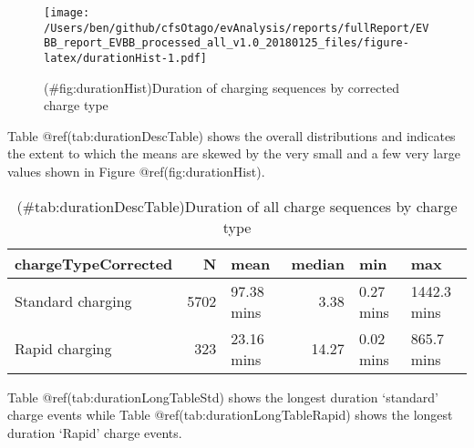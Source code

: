 \documentclass[]{article}
\begin{document}
\begin{figure}
\centering
\texttt{[image: /Users/ben/github/cfsOtago/evAnalysis/reports/fullReport/EVBB\_report\_EVBB\_processed\_all\_v1.0\_20180125\_files/figure-latex/durationHist-1.pdf]}
\caption{(\#fig:durationHist)Duration of charging sequences by corrected charge type}
\end{figure}

Table @ref(tab:durationDescTable) shows the overall distributions and indicates the extent to which the means are skewed by the very small and a few very large values shown in Figure @ref(fig:durationHist).

\begin{table}[t]

\caption{(\#tab:durationDescTable)Duration of all charge sequences by charge type}
\centering
\begin{tabular}{l|r|l|r|l|l}
\hline
chargeTypeCorrected & N & mean & median & min & max\\
\hline
Standard charging & 5702 & 97.38 mins & 3.38 & 0.27 mins & 1442.3 mins\\
\hline
Rapid charging & 323 & 23.16 mins & 14.27 & 0.02 mins & 865.7 mins\\
\hline
\end{tabular}
\end{table}

Table @ref(tab:durationLongTableStd) shows the longest duration `standard' charge events while Table @ref(tab:durationLongTableRapid) shows the longest duration `Rapid' charge events.
\end{document}
